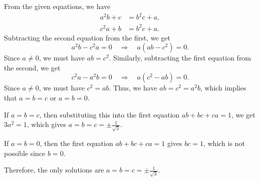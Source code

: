 From the given equations, we have
\begin{align*}
a^2b + c &= b^2c + a, \\
c^2a + b &= b^2c + a.
\end{align*}
Subtracting the second equation from the first, we get
\[
a^2b - c^2a = 0 \quad \Rightarrow \quad a(ab - c^2) = 0.
\]
Since \(a \neq 0\), we must have \(ab = c^2\). Similarly, subtracting the first equation from the second, we get
\[
c^2a - a^2b = 0 \quad \Rightarrow \quad a(c^2 - ab) = 0.
\]
Since \(a \neq 0\), we must have \(c^2 = ab\). Thus, we have \(ab = c^2 = a^2b\), which implies that \(a = b = c\) or \(a = b = 0\). 

If \(a = b = c\), then substituting this into the first equation \(ab + bc + ca = 1\), we get \(3a^2 = 1\), which gives \(a = b = c = \pm \frac{1}{\sqrt{3}}\).

If \(a = b = 0\), then the first equation \(ab + bc + ca = 1\) gives \(bc = 1\), which is not possible since \(b = 0\).

Therefore, the only solutions are \(a = b = c = \pm \frac{1}{\sqrt{3}}\).
